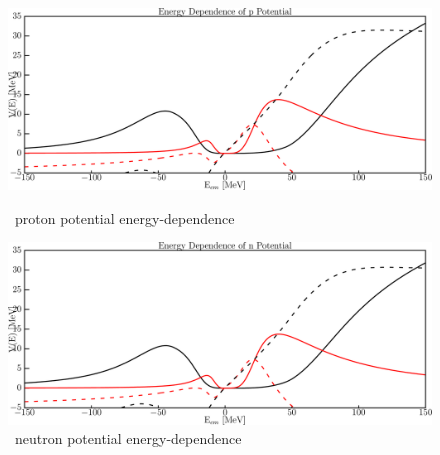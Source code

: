 \begin{figure}[H]
    \centering
    \begin{minipage}{0.45\textwidth}
        \centering
        \includegraphics[width=1.0\textwidth]{figures/o18_protonPotentials.png}
        \caption{\oEight\ proton potential energy-dependence}
        \label{DOMFitData_o18_proton_potentialComponent_energy}
    \end{minipage}\hfill
    \begin{minipage}{0.45\textwidth}
        \centering
        \includegraphics[width=1.0\textwidth]{figures/o18_neutronPotentials.png}
        \caption{\oEight\ neutron potential energy-dependence}
        \label{DOMFitData_o18_neutron_potentialComponent_energy}
    \end{minipage}
\end{figure}


